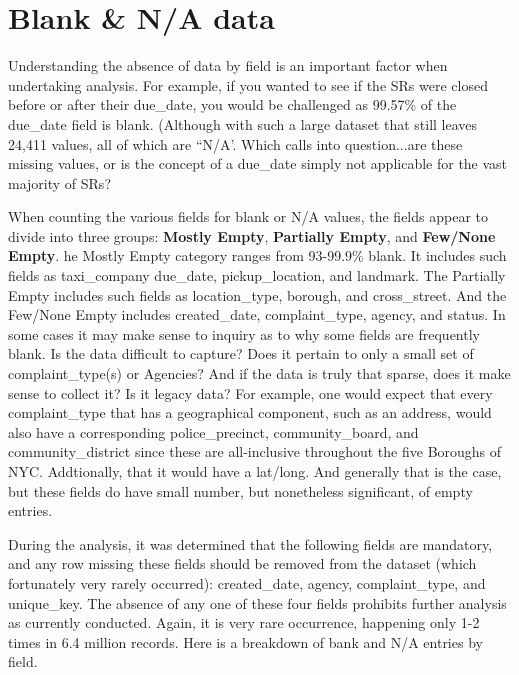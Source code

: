 \documentclass[12pt, titlepage]{article}
\begin{document}
 

\section{Blank \& N/A data}\label{sec:blanks}
Understanding the absence of data by field is an important factor 
when undertaking analysis. For example, if you wanted to see if the SRs were
closed before or after their due\_date, you would be challenged 
as 99.57\% of the due\_date field is blank. (Although with such a large dataset
that still leaves 24,411 values, all of which are ``N/A'. Which calls 
into question...are these missing values, or is the concept of a
due\_date simply not applicable for the vast majority of SRs?

When counting the various fields for blank or N/A values, the fields appear 
to divide into three groups: \textbf{Mostly Empty}, \textbf{Partially Empty}, 
and \textbf{Few/None Empty}. he Mostly Empty category ranges from 93-99.9\% blank. 
It includes such fields as taxi\_company due\_date, pickup\_location, and 
landmark. The Partially Empty includes such fields as location\_type, borough, 
and cross\_street. And the Few/None Empty includes created\_date, 
complaint\_type, agency, and status. In some cases it may make 
sense to inquiry as to why some fields are frequently blank. Is the data 
difficult to capture? Does it pertain to only a small set of 
complaint\_type(s) or Agencies? And if the data is truly that sparse, 
does it make sense to collect it? Is it legacy data? For example, 
one would expect that every complaint\_type that has a geographical 
component, such as an address, would also have a corresponding 
police\_precinct, community\_board, and community\_district since these
are all-inclusive throughout the five Boroughs of NYC. Addtionally, 
that it would have a lat/long. And generally that is the case, but these fields 
do have small number, but nonetheless significant, of empty entries. 

During the analysis, it was determined that the following fields are mandatory, 
and any row missing these fields should be removed from the dataset (which fortunately
very rarely occurred): created\_date, agency, complaint\_type, and unique\_key. 
The absence of any one of these four fields prohibits further analysis  as currently 
conducted. Again, it is very rare occurrence, happening only 1-2 times 
in 6.4 million records. Here is a breakdown of bank and N/A entries by field.
\end{document}
